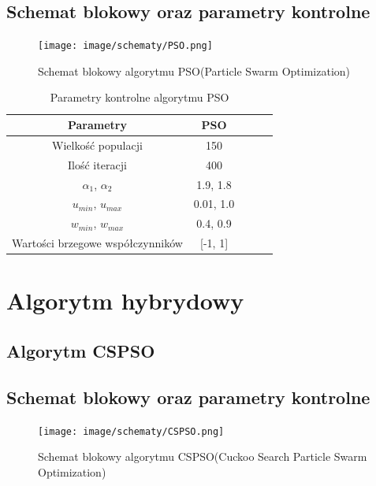 \documentclass[eng, pl, oneside, openright, final, openbib]{mgr}\DeclareUnicodeCharacter{0301}{\'{e}}
\begin{document}
\newpage
\subsection{Schemat blokowy oraz parametry kontrolne}
\begin{figure}[ht]
\centering
\label{fig:cspso}
\texttt{[image: image/schematy/PSO.png]}
\caption{Schemat blokowy algorytmu PSO(Particle Swarm Optimization)}
\end{figure}

\begin{table}[bt]
\caption{Parametry kontrolne algorytmu PSO} %
\label{table:4_1}
\centering %
\begin{tabular}{c c c c c} %
\hline\hline %
Parametry & PSO \\ [0.5ex] %
\hline %
Wielkość populacji & 150 \\ %
Ilość iteracji & 400 \\
$\alpha_{1}$, $\alpha_{2}$ & 1.9, 1.8 \\
$u_{min}$, $u_{max}$ & 0.01, 1.0 \\
$w_{min}$, $w_{max}$ & 0.4, 0.9 \\ [1ex] %
Wartości brzegowe współczynników & [-1, 1] \\
\hline %
\end{tabular}
\label{table:nonlin} %
\end{table}

\section{Algorytm hybrydowy}
\subsection{Algorytm CSPSO}
\newpage
\subsection{Schemat blokowy oraz parametry kontrolne}
\begin{figure}[!h]
\centering
\label{fig:cspso}
\texttt{[image: image/schematy/CSPSO.png]}
\caption{Schemat blokowy algorytmu CSPSO(Cuckoo Search Particle Swarm Optimization)}
\end{figure}
\end{document}
